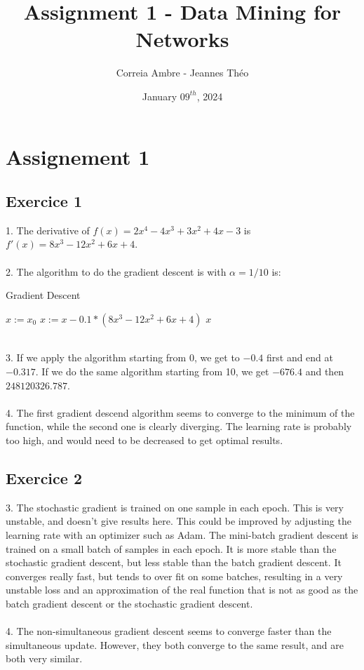 \documentclass{article}
\title{Assignment 1 - Data Mining for Networks}
\author{Correia Ambre - Jeannes Théo}
\date{January $09^{th}$, 2024}
\begin{document}
    \maketitle


    \section{Assignement 1}\label{sec:assignement-1}

    \subsection{Exercice 1}\label{subsec:exercice-1}
    1. The derivative of $f(x) = 2x^4 - 4x^3 + 3x^2 + 4x - 3$ is $f'(x) = 8x^3 - 12x^2 + 6x + 4$. \\ \\
    2. The algorithm to do the gradient descent is with $\alpha = 1/10$ is:\\
    \begin{algorithm}
        \caption{Gradient Descent}\label{alg:algorithm}
        \begin{algorithmic}
            \STATE $x := x_0$
            \STATE $x := x - 0.1 * (8x^3 - 12x^2 + 6x + 4)$
            \ENDWHILE
            \RETURN $x$
        \end{algorithmic}
    \end{algorithm} \\
    3. If we apply the algorithm starting from 0, we get to $-0.4$ first and end at $-0.317$.
    If we do the same algorithm starting from 10, we get $-676.4$ and then $248120326.787$. \\ \\
    4. The first gradient descend algorithm seems to converge to the minimum of the function, while the second one is clearly diverging.
    The learning rate is probably too high, and would need to be decreased to get optimal results.

    \subsection{Exercice 2}\label{subsec:exercice-2}

    3. The stochastic gradient is trained on one sample in each epoch.
    This is very unstable, and doesn't give results here.
    This could be improved by adjusting the learning rate with an optimizer such as Adam.
    The mini-batch gradient descent is trained on a small batch of samples in each epoch.
    It is more stable than the stochastic gradient descent, but less stable than the batch gradient descent.
    It converges really fast, but tends to over fit on some batches, resulting in a very unstable loss and an
    approximation of the real function that is not as good as the batch gradient descent or the stochastic gradient descent. \\ \\
    4. The non-simultaneous gradient descent seems to converge faster than the simultaneous update.
    However, they both converge to the same result, and are both very similar. \\
\end{document}
